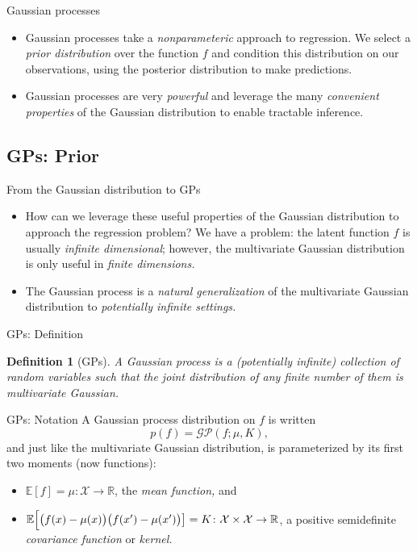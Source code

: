 \documentclass[xcolor={dvipsnames},hyperref={breaklinks=true},12pt]{beamer}
\newtheorem{defn}{Definition}
\newcommand{\mc}[1]{\mathcal{#1}}
\newcommand{\R}{\mathbb{R}}
\newcommand{\Exp}{\mathbb{E}}
\newcommand{\emphr}[1]{{\textcolor{or}{\itshape #1}}}
\begin{document}
\begin{frame}{Gaussian processes}
  \begin{itemize}
  \item Gaussian processes take a \emphr{nonparameteric} approach to
    regression.  We select a \emphr{prior distribution} over the
    function $f$ and condition this distribution on our observations,
    using the posterior distribution to make predictions.
  \item Gaussian processes are very \emphr{powerful} and leverage
    the many \emphr{convenient properties} of the Gaussian
    distribution to enable tractable inference.
  \end{itemize}
\end{frame}

\subsection{GPs: Prior}

\begin{frame}{From the Gaussian distribution to GPs}
  \begin{itemize}
    \item How can we leverage these useful properties of the Gaussian
      distribution to approach the regression problem?  We have a
      problem: the latent function $f$ is usually \emphr{infinite
        dimensional}; however, the multivariate Gaussian distribution
      is only useful in \emphr{finite dimensions.}
    \item The Gaussian process is a \emphr{natural generalization} of
      the multivariate Gaussian distribution to \emphr{potentially
        infinite settings.}
  \end{itemize}
\end{frame}

\begin{frame}{GPs: Definition}
  \begin{defn}[GPs]
    A \emphr{Gaussian process} is a (potentially infinite) collection
    of random variables such that the joint distribution of any finite
    number of them is multivariate Gaussian.
  \end{defn}
\end{frame}

\begin{frame}{GPs: Notation}
  A Gaussian process distribution on $f$ is written
  \begin{equation*}
    p(f) = \mc{GP}(f; \mu, K),
  \end{equation*}
  and just like the multivariate Gaussian distribution, is
  parameterized by its first two moments (now functions):
  \begin{itemize}
  \item $\Exp[f] = \mu\colon \mc{X} \to \R$, the \emphr{mean function,} and
  \item $\Exp\Bigl[\bigl(f(x) - \mu(x)\bigr)\bigl(f(x') - \mu(x')\bigr)\bigr]
    = K\colon \mc{X} \times \mc{X} \to \R$,
    a positive semidefinite \emphr{covariance function} or \emphr{kernel.}
  \end{itemize}
\end{frame}
\end{document}
